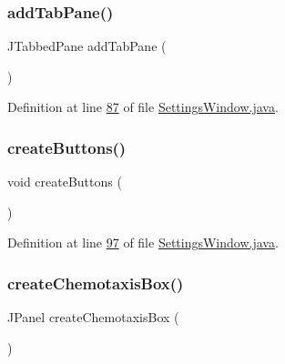 \subsubsection{\texorpdfstring{add\+Tab\+Pane()}{addTabPane()}}
{\footnotesize\ttfamily J\+Tabbed\+Pane add\+Tab\+Pane (\begin{DoxyParamCaption}{ }\end{DoxyParamCaption})\hspace{0.3cm}{\ttfamily [private]}}



Definition at line \hyperlink{_settings_window_8java_source_l00087}{87} of file \hyperlink{_settings_window_8java_source}{Settings\+Window.\+java}.

\hypertarget{classgui_1_1_settings_window_a48645e737c205837da587e63e4661cc4}{}\label{classgui_1_1_settings_window_a48645e737c205837da587e63e4661cc4} 
\subsubsection{\texorpdfstring{create\+Buttons()}{createButtons()}}
{\footnotesize\ttfamily void create\+Buttons (\begin{DoxyParamCaption}{ }\end{DoxyParamCaption})\hspace{0.3cm}{\ttfamily [private]}}



Definition at line \hyperlink{_settings_window_8java_source_l00097}{97} of file \hyperlink{_settings_window_8java_source}{Settings\+Window.\+java}.

\hypertarget{classgui_1_1_settings_window_a770288d77248b778f94df36a48ba95c3}{}\label{classgui_1_1_settings_window_a770288d77248b778f94df36a48ba95c3} 
\subsubsection{\texorpdfstring{create\+Chemotaxis\+Box()}{createChemotaxisBox()}}
{\footnotesize\ttfamily J\+Panel create\+Chemotaxis\+Box (\begin{DoxyParamCaption}{ }\end{DoxyParamCaption})}

